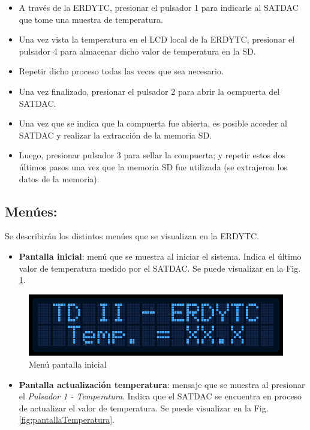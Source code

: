 \documentclass[conference]{IEEEtran}
\begin{document}
\begin{itemize}
\item A través de la ERDYTC, presionar el pulsador 1 para indicarle al SATDAC que tome una muestra de temperatura.
\item Una vez vista la temperatura en el LCD local de la ERDYTC, presionar el pulsador 4 para almacenar dicho valor de temperatura en la SD.
\item Repetir dicho proceso todas las veces que sea necesario.
\item Una vez finalizado, presionar el pulsador 2 para abrir la ocmpuerta del SATDAC.
\item Una vez que se indica que la compuerta fue abierta, es posible acceder al SATDAC y realizar la extracción de la memoria SD.
\item Luego, presionar pulsador 3 para sellar la compuerta; y repetir estos dos últimos pasos una vez que la memoria SD fue utilizada (se extrajeron los datos de la memoria).
\end{itemize}
\subsection{Menúes:}
\label{sec:org85aa6e5}
Se describirán los distintos menúes que se visualizan en la ERDYTC.

\begin{itemize}
\item \textbf{Pantalla inicial}: menú que se muestra al iniciar el sistema. Indica el último valor de temperatura medido por el SATDAC. Se puede visualizar en la Fig. \ref{fig:pantallaInicial}.
\end{itemize}

\begin{figure}[htbp]
\centering
\includegraphics[width=.9\linewidth]{../../images/pantallaInicial.png}
\caption{\label{fig:pantallaInicial}Menú pantalla inicial}
\end{figure}

\begin{itemize}
\item \textbf{Pantalla actualización temperatura}: mensaje que se muestra al presionar el \emph{Pulsador 1 - Temperatura}. Indica que el SATDAC se encuentra en proceso de actualizar el valor de temperatura. Se puede visualizar en la Fig. \ref{fig:pantallaTemperatura}.
\end{itemize}
\end{document}
